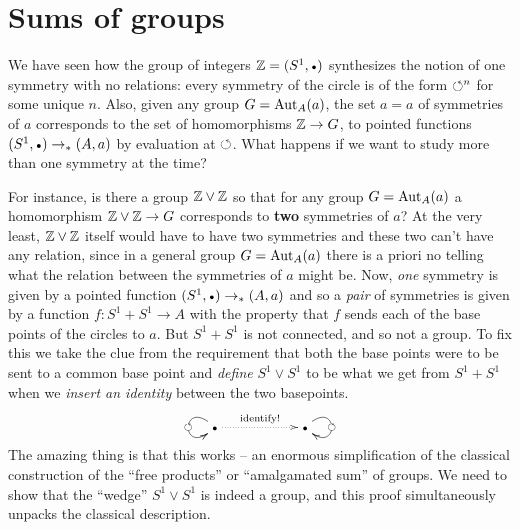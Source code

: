 \section{Sums of groups}
\label{sec:coprod}
We have seen how the group of integers $\ZZ=(S^1,\base)$ synthesizes the notion of one symmetry with no relations: every symmetry of the circle is of the form $\circlearrowleft^n$ for some unique $n$.  Also, given any group $G=\mathrm{Aut}_A(a)$, the set $a=a$ of symmetries of $a$ corresponds to the set of homomorphisms $\mathbb{Z}\to G$, \ie to pointed functions $(S^1,\base)\to_*(A,a)$ by evaluation at $\circlearrowleft$.  What happens if we want to study more than one symmetry at the time?  

For instance, is there a group $\ZZ\vee%
\ZZ$ so that for any group $G=\mathrm{Aut}_A(a)$ a homomorphism $\ZZ\vee%
\ZZ\to G$ corresponds to {\bf two} symmetries of $a$?  
At the very least, $\mathbb{Z}\vee\mathbb{Z}$ itself would have to have two symmetries and these two can't have any relation, since in a general group $G=\mathrm{Aut}_A(a)$ there is a priori no telling what the relation between the symmetries of $a$ might be.  
Now, \emph{one} symmetry is given by a pointed function $(S^1,\base)\to_*(A,a)$ and so a \emph{pair} of symmetries is given by a function $f:S^1+S^1\to A$ with the property that $f$ sends each of the base points of the circles to $a$.  But $S^1+S^1$ is not connected, and so not a group.  To fix this we take the clue from the requirement that both the base points were to be sent to a common base point and \emph{define} $S^1\vee S^1$ to be what we get from $S^1+S^1$ when we \emph{insert an identity} between the two basepoints.
$$\xymatrix{\base\ar@(ul,dl)[]|{\Sloop}\ar@{.>}[rr]^{\text{identify!}}&&\base\ar@(ur,dr)[]|{\Sloop}}
$$
The amazing thing is that this works -- an enormous simplification of the classical construction of the ``free products'' or ``amalgamated sum'' of groups.  We need to show that the ``wedge'' $S^1\vee S^1$ is indeed a group, and this proof simultaneously unpacks the classical description.


